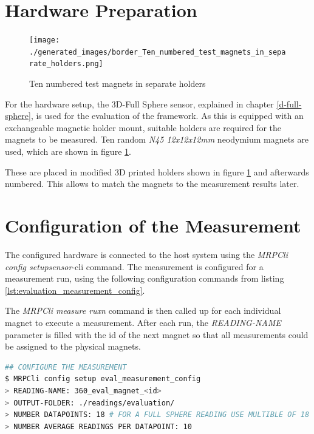 \hypertarget{hardware-preparation}{%
\section{Hardware Preparation}\label{hardware-preparation}}

\begin{figure}
\centering
\texttt{[image: ./generated\_images/border\_Ten\_numbered\_test\_magnets\_in\_separate\_holders.png]}
\caption{Ten numbered test magnets in separate holders
\label{Ten_numbered_test_magnets_in_separate_holders.png}}
\end{figure}

For the hardware setup, the 3D-Full Sphere sensor, explained in chapter
\ref{d-full-sphere}, is used for the evaluation of the framework. As
this is equipped with an exchangeable magnetic holder mount, suitable
holders are required for the magnets to be measured. Ten random
\emph{N45 12x12x12mm} neodymium magnets are used, which are shown in
figure \ref{Ten_numbered_test_magnets_in_separate_holders.png}.

These are placed in modified 3D printed holders shown in figure
\ref{Ten_numbered_test_magnets_in_separate_holders.png} and afterwards
numbered. This allows to match the magnets to the measurement results
later.

\hypertarget{configuration-of-the-measurement}{%
\section{Configuration of the
Measurement}\label{configuration-of-the-measurement}}

The configured hardware is connected to the host system using the
\emph{MRPCli config setupsensor}-\gls{cli} command. The measurement is
configured for a measurement run, using the following configuration
commands from listing \ref{lst:evaluation_measurement_config}.

The \emph{MRPCli measure ruxn} command is then called up for each
individual magnet to execute a measurement. After each run, the
\emph{READING-NAME} parameter is filled with the id of the next magnet
so that all measurements could be assigned to the physical magnets.

\begin{lstlisting}[language=bash, caption={Measurement configuration for evaluation measurement}, label=lst:evaluation_measurement_config]
## CONFIGURE THE MEASUREMENT
$ MRPCli config setup eval_measurement_config
> READING-NAME: 360_eval_magnet_<id>
> OUTPUT-FOLDER: ./readings/evaluation/ 
> NUMBER DATAPOINTS: 18 # FOR A FULL SPHERE READING USE MULTIBLE OF 18
> NUMBER AVERAGE READINGS PER DATAPOINT: 10
\end{lstlisting}

